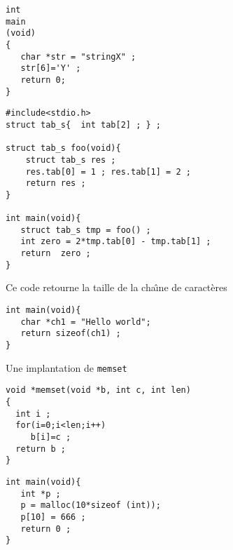 \begin{frame}[fragile]
\begin{verbatim}
int 
main
(void)
{
   char *str = "stringX" ;
   str[6]='Y' ;
   return 0;
}
\end{verbatim}
\end{frame}
\begin{frame}[fragile]
\begin{verbatim}
#include<stdio.h>
struct tab_s{  int tab[2] ; } ;

struct tab_s foo(void){
    struct tab_s res ;
    res.tab[0] = 1 ; res.tab[1] = 2 ;
    return res ;
}

int main(void){
   struct tab_s tmp = foo() ;
   int zero = 2*tmp.tab[0] - tmp.tab[1] ;
   return  zero ;
}
\end{verbatim}
\end{frame}
\begin{frame}[fragile]
Ce code retourne la taille de la cha\^\i{}ne de caract\`eres
\begin{verbatim}
int main(void){
   char *ch1 = "Hello world";
   return sizeof(ch1) ;
}
\end{verbatim}
\end{frame}
\begin{frame}[fragile]
Une implantation de \verb+memset+
\begin{verbatim}
void *memset(void *b, int c, int len)
{
  int i ;
  for(i=0;i<len;i++)
     b[i]=c ;
  return b ;
}
\end{verbatim}
\end{frame}
\begin{frame}[fragile]
\begin{verbatim}
int main(void){  
   int *p ;
   p = malloc(10*sizeof (int));
   p[10] = 666 ; 
   return 0 ;
}
\end{verbatim}
\end{frame}
